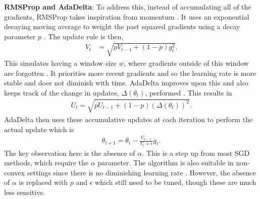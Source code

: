 \textbf{RMSProp and AdaDelta}: To address this, instead of accumulating all of the gradients, RMSProp takes inspiration from momentum \citep{ruder2016overview, rmsprop2012}. It uses an exponential decaying moving average to weight the past squared gradients using a decay parameter $p$ \citep{rmsprop2012, kingma2014adam}. The update rule is then,
\begin{align}
    V_t &= \sqrt{p V_{t-1} + (1 - p)g_t^2}.
\end{align}
This simulates having a window size $w$, where gradients outside of this window are forgotten \citep{rmsprop2012, kingma2014adam}. It priorities more recent gradients and so the learning rate is more stable and does not diminish with time. AdaDelta improves upon this and also keeps track of the change in updates, $\Delta(\theta_t)$, performed \citep{zeiler2012adadelta}. This results in
\begin{align}
    U_t = \sqrt{p U_{t-1} + (1 - p)(\Delta(\theta_t))^2}.
\end{align}
AdaDelta then uses these accumulative updates at each iteration to perform the actual update which is 
\begin{align}
    \theta_{t+1} = \theta_{t} - \frac{U_{t-1}}{V_{t} + \epsilon} g_t.
\end{align}
The key observation here is the absence of $\alpha$. This is a step up from most SGD methods, which require the $\alpha$ parameter. The algorithm is also suitable in non-convex settings since there is no diminishing learning rate \citep{zeiler2012adadelta}. However, the absence of $\alpha$ is replaced with $p$ and $\epsilon$ which still need to be tuned, though these are much less sensitive.

